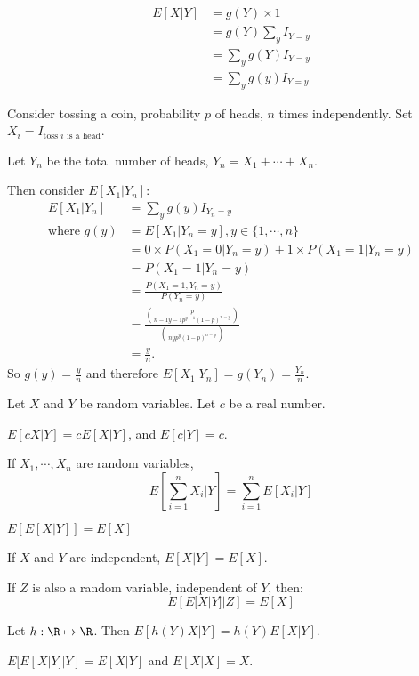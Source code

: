 \documentclass[../Main.tex]{subfiles}
\begin{document}
\begin{align*}
    E[X | Y] &= g(Y) \times 1 \\
    &= g(Y) \sum_y I_{Y = y} \\
    &= \sum_y g(Y) I_{Y = y} \\
    &= \sum_y g(y) I_{Y = y}
\end{align*}
\begin{example}
    \label{exCoinTossCondExpec}
    Consider tossing a coin, probability $p$ of heads, $n$ times independently. Set $X_i = I_{\text{toss } i \text{ is a head}}$.\par
    Let $Y_n$ be the total number of heads, $Y_n = X_1 + \cdots + X_n$.\par
    Then consider $E[X_1 | Y_n]$:
    \begin{align*}
        E[X_1 | Y_n] &= \sum_y g(y) I_{Y_n = y} \\
        \text{where } g(y) &= E[X_1 | Y_n = y], y \in \{1, \cdots, n\} \\
        &= 0 \times P(X_1 = 0 | Y_n = y) + 1 \times P(X_1 = 1 | Y_n = y) \\
        &= P(X_1 = 1 | Y_n = y) \\
        &= \frac{P(X_1 = 1, Y_n = y)}{P(Y_n = y)} \\
        &= \frac{p \choose{n-1}{y-1} p^{y-1} (1-p)^{n-y}}{\choose{n}{y} p^y (1-p)^{n-y}} \\
        &= \frac{y}{n}.
    \end{align*}
    So $g(y) = \frac{y}{n}$ and therefore $E[X_1 | Y_n] = g(Y_n) = \frac{Y_n}{n}$.
\end{example}
\begin{propositions} {
        Let $X$ and $Y$ be random variables. Let $c$ be a real number.
        \label{propsCondExpecProperties}
    }
    \item $E[cX | Y] = cE[X | Y]$, and $E[c | Y] = c$. \label{propCondExpecConstant}
    \item If $X_1, \cdots, X_n$ are random variables,
        \begin{equation*}
            E\left[\sum_{i=1}^n X_i | Y\right] = \sum_{i=1}^n E[X_i | Y]
        \end{equation*}
        \label{propCondExpecSum}
    \item $E[E[X | Y]] = E[X]$ \label{propCondExpecTwice}
    \item If $X$ and $Y$ are independent, $E[X | Y] = E[X]$. \label{propCondExpecIndep}
    \item If $Z$ is also a random variable, independent of $Y$, then:
        \begin{equation*}
            E\left[E[X | Y] | Z\right] = E[X]
        \end{equation*}
        \label{propCondExpecSecondIndepRV}
    \item Let $h : \R \mapsto \R$. Then $E[h(Y) X | Y] = h(Y) E[X | Y]$. \label{propCondExpecFactorOutFunc}
    \item $E[E[X | Y] | Y] = E[X | Y]$ and $E[X | X] = X$. \label{propCondExpecTwiceGiven}
\end{propositions}
\end{document}
